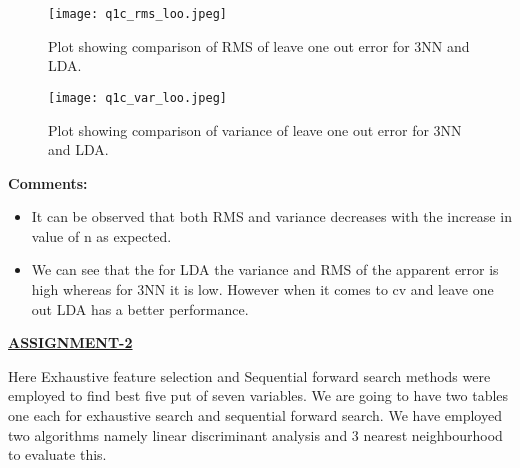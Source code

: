\documentclass[paper=a4, fontsize=11pt]{scrartcl} %
\begin{document}

\begin{center}
\begin{figure}[H]
\hspace{2 cm}
\texttt{[image: q1c\_rms\_loo.jpeg]} 
\caption{Plot showing comparison of RMS of leave one out error for 3NN and LDA.}
\end{figure}
\end{center}


\begin{center}
\begin{figure}[H]
\hspace{2 cm}
\texttt{[image: q1c\_var\_loo.jpeg]} 
\caption{Plot showing comparison of variance of leave one out error for 3NN and LDA.}

\end{figure}
\end{center}




\textbf{Comments:}
\newline
\begin{itemize}



\item It can be observed that both RMS and variance decreases with the increase in value of n as expected.

\item We can see that the for LDA the variance and RMS of the apparent error is high whereas for 3NN it is low. However when it comes to cv and leave one out LDA has a better 
performance. 

\end{itemize}

\huge		
\begin{center}
\textbf{\underline{ASSIGNMENT-2}}
\end{center}
\normalsize

Here Exhaustive feature selection and Sequential forward search methods were employed to find best five put of seven variables. \newline \newline
We are going to have two tables one each for exhaustive search and sequential forward search. \newline \newline
We have employed two algorithms namely linear discriminant analysis and 3 nearest neighbourhood to evaluate this.
\newline
\end{document}
